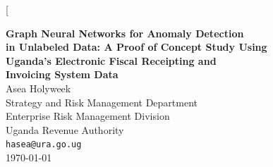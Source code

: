\documentclass[10pt,twocolumn]{article}
\begin{document}
\twocolumn[{%
\begin{@twocolumnfalse}
\vspace*{4pt}
\begin{center}
  {\LARGE\bfseries Graph Neural Networks for Anomaly Detection\\[4pt]
   in Unlabeled Data: A Proof of Concept Study Using\\[4pt]
   Uganda's Electronic Fiscal Receipting and\\[4pt]
   Invoicing System Data}\\[14pt]
  {\large Asea Holyweek}\\[2pt]
  {\normalsize Strategy and Risk Management Department}\\[1pt]
  {\normalsize Enterprise Risk Management Division}\\[1pt]
  {\normalsize Uganda Revenue Authority}\\[2pt]
  {\normalsize \texttt{hasea@ura.go.ug}}\\[16pt]
  \today
\end{center}


\end{@twocolumnfalse}}
\end{document}

